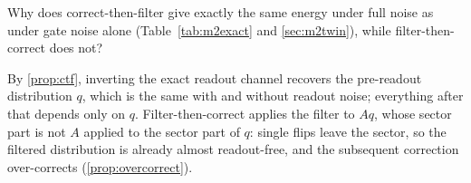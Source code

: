 \begin{exer}
  Why does correct-then-filter give exactly the same energy under full noise as under gate
  noise alone (Table~\ref{tab:m2exact} and \cref{sec:m2twin}), while filter-then-correct does
  not?
\end{exer}
\begin{sol}
  By \cref{prop:ctf}, inverting the exact readout channel recovers the pre-readout
  distribution $q$, which is the same with and without readout noise; everything after that
  depends only on $q$. Filter-then-correct applies the filter to $Aq$, whose sector part is not
  $A$ applied to the sector part of $q$: single flips leave the sector, so the filtered
  distribution is already almost readout-free, and the subsequent correction over-corrects
  (\cref{prop:overcorrect}).
\end{sol}

